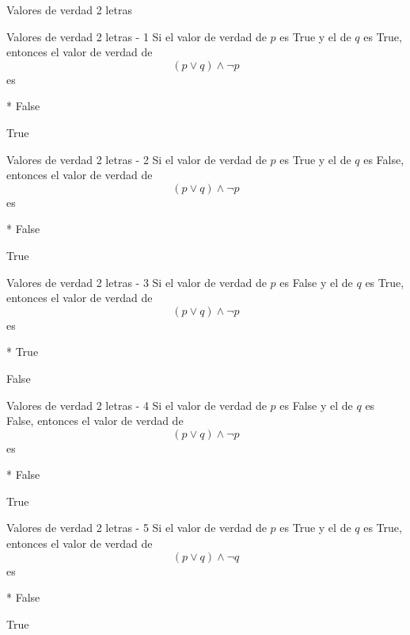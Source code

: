 \documentclass[a4,11pt]{aleph-notas}
\begin{document}
\begin{quiz}{Valores de verdad 2 letras}

\begin{multi}%
    {Valores de verdad 2 letras - 1}
    Si el valor de verdad de $p$ es True y el de $q$ es True, entonces el valor de verdad de 
    \[
        (p \lor q) \land \neg p 
    \]
    es
    \item[]* False
    \item[] True
\end{multi}

\begin{multi}%
    {Valores de verdad 2 letras - 2}
    Si el valor de verdad de $p$ es True y el de $q$ es False, entonces el valor de verdad de 
    \[
        (p \lor q) \land \neg p 
    \]
    es
    \item[]* False
    \item[] True
\end{multi}

\begin{multi}%
    {Valores de verdad 2 letras - 3}
    Si el valor de verdad de $p$ es False y el de $q$ es True, entonces el valor de verdad de 
    \[
        (p \lor q) \land \neg p 
    \]
    es
    \item[]* True
    \item[] False
\end{multi}

\begin{multi}%
    {Valores de verdad 2 letras - 4}
    Si el valor de verdad de $p$ es False y el de $q$ es False, entonces el valor de verdad de 
    \[
        (p \lor q) \land \neg p 
    \]
    es
    \item[]* False
    \item[] True
\end{multi}

\begin{multi}%
    {Valores de verdad 2 letras - 5}
    Si el valor de verdad de $p$ es True y el de $q$ es True, entonces el valor de verdad de 
    \[
        (p \lor q) \land \neg q 
    \]
    es
    \item[]* False
    \item[] True
\end{multi}


\end{quiz}
\end{document}
